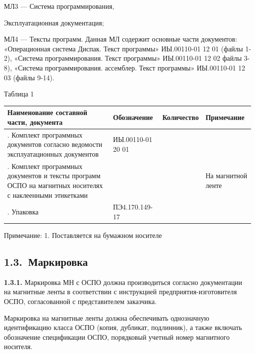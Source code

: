 \documentclass[11pt,a4paper]{article}
\begin{document}
МЛ3 --- Система программирования,

Эксплуатационная документация;

МЛ4 --- Тексты программ. Данная МЛ содержит основные части документов: «Операционная система Диспак. Текст программы» ИЫ.00110-01 12 01 (файлы 1-2), «Система программирования. Текст программы» ИЫ.00110-01 12 02 файлы 3-8), «Система программирования. ассемблер. Текст программы» ИЫ.00110-01 12 03 (файлы 9-14).

Таблица 1

\begin{center}\small\begin{tabularx}{\linewidth}{|>{\raggedright\arraybackslash\hsize=1.443\hsize}X|>{\raggedright\arraybackslash\hsize=1.574\hsize}X|>{\raggedright\arraybackslash\hsize=0.393\hsize}X|>{\raggedright\arraybackslash\hsize=0.590\hsize}X|}\hline
\small\bfseries\hspace{0pt}Наименование составной части, документа & \small\bfseries\hspace{0pt}Обозначение & \small\bfseries\hspace{0pt}Количество & \small\bfseries\hspace{0pt}Примечание \\ \hline
1. Комплект программных документов согласно ведомости эксплуатационных документов & ИЫ.00110-01 20 01 & 1 & 1 \\ \hline
2. Комплект программных документов и тексты программ ОСПО на магнитных носителях с наклеенными этикетками &  &  & На магнитной ленте \\ \hline
3. Упаковка & ПЭ4.170.149-17 & 1 &  \\ \hline
\end{tabularx}\end{center}

Примечание: 1. Поставляется на бумажном носителе

\subsection*{1.3.~Маркировка}
\par\textbf{1.3.1.} Маркировка МН с ОСПО должна производиться согласно документации на магнитные ленты в соответствии с инструкцией предприятия-изготовителя ОСПО, согласованной с представителем заказчика.\par
Маркировка на магнитные ленты должна обеспечивать однозначную идентификацию класса ОСПО (копия, дубликат, подлинник), а также включать обозначение спецификации ОСПО, порядковый учетный номер магнитного носителя.
\end{document}
